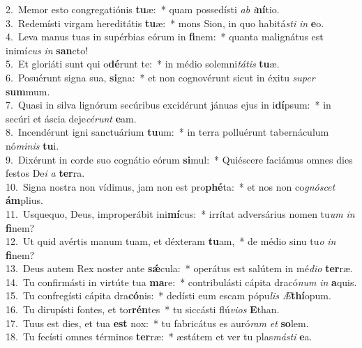 {2.~}Memor esto congregatiónis \textbf{tu}æ:~* quam possedísti \textit{ab} \textit{i}\textbf{ní}tio.\\
{3.~}Redemísti virgam hereditátis \textbf{tu}æ:~* mons Sion, in quo habitá\textit{sti} \textit{in} \textbf{e}o.\\
{4.~}Leva manus tuas in supérbias eórum in \textbf{fi}nem:~* quanta malignátus est inimí\textit{cus} \textit{in} \textbf{san}cto!\\
{5.~}Et gloriáti sunt qui o\textbf{dé}runt te:~* in médio solemni\textit{tá}\textit{tis} \textbf{tu}æ.\\
{6.~}Posuérunt signa sua, \textbf{si}gna:~* et non cognovérunt sicut in éxitu \textit{su}\textit{per} \textbf{sum}mum.\\
{7.~}Quasi in silva lignórum secúribus excidérunt jánuas ejus in i\textbf{dí}psum:~* in secúri et áscia deje\textit{cé}\textit{runt} \textbf{e}am.\\
{8.~}Incendérunt igni sanctuárium \textbf{tu}um:~* in terra polluérunt tabernáculum nó\textit{mi}\textit{nis} \textbf{tu}i.\\
{9.~}Dixérunt in corde suo cognátio eórum \textbf{si}mul:~* Quiéscere faciámus omnes dies festos De\textit{i} \textit{a} \textbf{ter}ra.\\
{10.~}Signa nostra non vídimus, jam non est pro\textbf{phé}ta:~* et nos non co\textit{gnó}\textit{scet} \textbf{ám}plius.\\
{11.~}Usquequo, Deus, improperábit ini\textbf{mí}cus:~* irrítat adversárius nomen tu\textit{um} \textit{in} \textbf{fi}nem?\\
{12.~}Ut quid avértis manum tuam, et déxteram \textbf{tu}am,~* de médio sinu tu\textit{o} \textit{in} \textbf{fi}nem?\\
{13.~}Deus autem Rex noster ante \textbf{sǽ}cula:~* operátus est salútem in mé\textit{di}\textit{o} \textbf{ter}ræ.\\
{14.~}Tu confirmásti in virtúte tua \textbf{ma}re:~* contribulásti cápita dracó\textit{num} \textit{in} \textbf{a}quis.\\
{15.~}Tu confregísti cápita dra\textbf{có}nis:~* dedísti eum escam pópu\textit{lis} \textit{Æ}\textbf{thí}opum.\\
{16.~}Tu dirupísti fontes, et tor\textbf{rén}tes~* tu siccásti flú\textit{vi}\textit{os} \textbf{E}than.\\
{17.~}Tuus est dies, et tua \textbf{est} nox:~* tu fabricátus es auró\textit{ram} \textit{et} \textbf{so}lem.\\
{18.~}Tu fecísti omnes términos \textbf{ter}ræ:~* æstátem et ver tu plas\textit{má}\textit{sti} \textbf{e}a.\\

